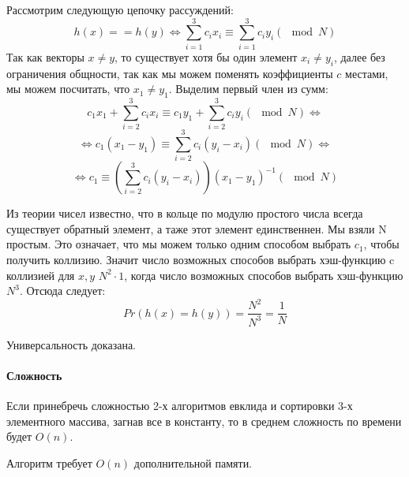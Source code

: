\documentclass[12pt]{article}
\begin{document}
Рассмотрим следующую цепочку рассуждений:
$$
h(x) == h(y) \Leftrightarrow \sum\limits_{i = 1}^3 c_i x_i
\equiv \sum\limits_{i = 1}^3 c_i y_i (\mod N)
$$
Так как векторы $ x \ne y $, то существует хотя бы один элемент $ x_i \ne y_i $,
далее без ограничения общности, так как мы можем поменять
коэффициенты $ c $ местами, мы можем посчитать, что $ x_1 \ne y_1 $.
Выделим первый член из сумм:
$$
c_1 x_1 + \sum\limits_{i = 2}^3 c_i x_i \equiv
c_1 y_1 + \sum\limits_{i = 2}^3 c_i y_i (\mod N)
\Leftrightarrow
$$
$$
\Leftrightarrow
c_1(x_1 - y_1) \equiv \sum\limits_{i = 2}^3 c_i (y_i - x_i) (\mod N)
\Leftrightarrow
$$
$$
\Leftrightarrow
c_1 \equiv \left(\sum\limits_{i = 2}^3 c_i (y_i - x_i)\right)
(x_1 - y_1)^{-1} (\mod N)
$$

Из теории чисел известно, что в кольце по модулю простого числа всегда
существует обратный элемент, а таже этот элемент единственнен. Мы взяли
N простым. Это означает, что мы можем только одним способом выбрать $ c_1 $,
чтобы получить коллизию. Значит число возможных способов выбрать хэш-функцию
c коллизией для $ x, y $ $ N^2 \cdot 1 $, когда число возможных способов
выбрать хэш-функцию $ N^3 $. Отсюда следует:
$$
Pr(h(x) = h(y)) = \frac{N^2}{N^3} = \frac{1}{N}
$$

Универсальность доказана.



\paragraph{Сложность}
Если принебречь сложностью 2-х алгоритмов евклида и сортировки 3-х
элементного массива, загнав все в константу, то в среднем сложность
по времени будет $ O(n) $.

Алгоритм требует $ O(n) $ дополнительной памяти.
\end{document}
